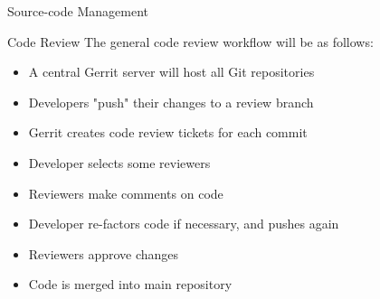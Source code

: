 \documentclass{report}
\begin{document}
\begin{section}{Source-code Management}
\begin{subsection}{Code Review}
The general code review workflow will be as follows:\\

\begin{itemize}
\item A central Gerrit server will host all Git repositories
\item Developers "push" their changes to a review branch
\item Gerrit creates code review tickets for each commit
\item Developer selects some reviewers
\item Reviewers make comments on code
\item Developer re-factors code if necessary, and pushes again
\item Reviewers approve changes
\item Code is merged into main repository
\end{itemize}

\end{subsection}

\end{section}
\end{document}

